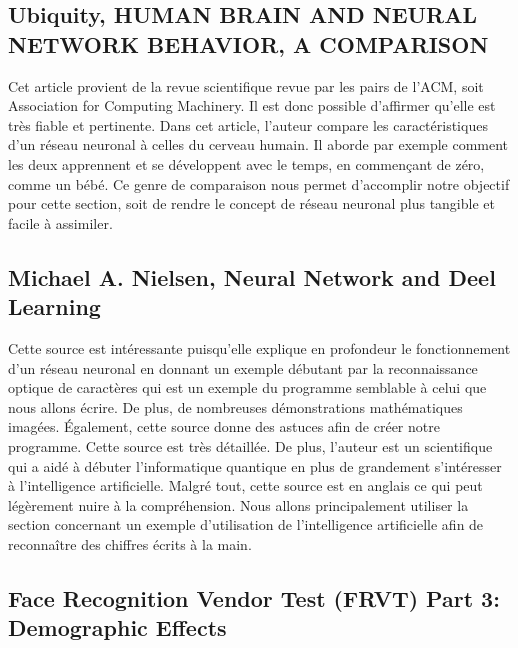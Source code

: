 \documentclass[letterpaper,10pt,french]{sphinxmanual}
\begin{document}
\subsection{Ubiquity, HUMAN BRAIN AND NEURAL NETWORK BEHAVIOR, A COMPARISON}
\label{\detokenize{biblio_commented:ubiquity-human-brain-and-neural-network-behavior-a-comparison}}

Cet article provient de la revue scientifique revue par les pairs de l’ACM, soit Association for Computing Machinery.
Il est donc possible d’affirmer qu’elle est très fiable et pertinente. Dans cet article, l’auteur compare
les caractéristiques d’un réseau neuronal à celles du cerveau humain. Il aborde par exemple comment les deux apprennent et
se développent avec le temps, en commençant de zéro, comme un bébé. Ce genre de comparaison nous permet d’accomplir notre objectif
pour cette section, soit de rendre le concept de réseau neuronal plus tangible et facile à assimiler.


\subsection{Michael A. Nielsen, Neural Network and Deel Learning}
\label{\detokenize{biblio_commented:michael-a-nielsen-neural-network-and-deel-learning}}

Cette source est intéressante puisqu’elle explique en profondeur le fonctionnement
d’un réseau neuronal en donnant un exemple débutant par la reconnaissance optique
de caractères qui est un exemple du programme semblable à celui que nous allons
écrire. De plus, de nombreuses démonstrations mathématiques imagées. Également,
cette source donne des astuces afin de créer notre programme. Cette source est
très détaillée. De plus, l’auteur est un scientifique qui a aidé à débuter
l’informatique quantique en plus de grandement s’intéresser à l’intelligence
artificielle. Malgré tout, cette source est en anglais ce qui peut
légèrement nuire à la compréhension. Nous allons principalement utiliser la
section concernant un exemple d’utilisation de l’intelligence
artificielle afin de reconnaître des chiffres écrits à la main.


\subsection{Face Recognition Vendor Test (FRVT) Part 3: Demographic Effects}
\label{\detokenize{biblio_commented:face-recognition-vendor-test-frvt-part-3-demographic-effects}}
\end{document}
